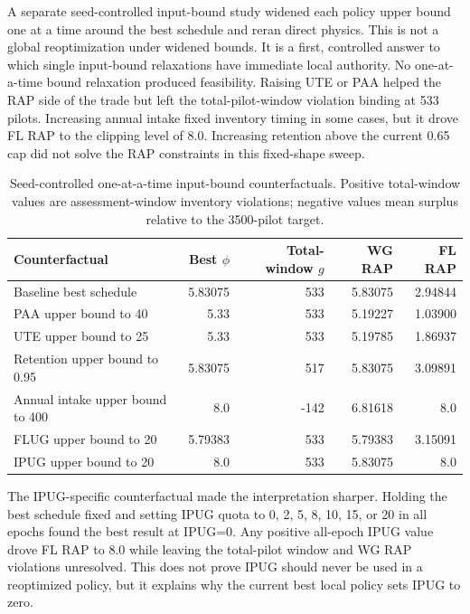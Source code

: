 \documentclass[10pt]{article}
\begin{document}
A separate seed-controlled input-bound study widened each policy upper bound
one at a time around the best schedule and reran direct physics. This is not a
global reoptimization under widened bounds. It is a first, controlled answer to
which single input-bound relaxations have immediate local authority. No
one-at-a-time bound relaxation produced feasibility. Raising UTE or PAA helped
the RAP side of the trade but left the total-pilot-window violation binding at
533 pilots. Increasing annual intake fixed inventory timing in some cases, but
it drove FL RAP to the clipping level of 8.0. Increasing retention above the
current 0.65 cap did not solve the RAP constraints in this fixed-shape sweep.

\begin{table}[htbp]
\centering
\caption{Seed-controlled one-at-a-time input-bound counterfactuals. Positive
total-window values are assessment-window inventory violations; negative values
mean surplus relative to the 3500-pilot target.}
\label{tab:bound-relaxation}
\begin{tabular}{lrrrr}
\toprule
Counterfactual & Best $\phi$ & Total-window $g$ & WG RAP & FL RAP \\
\midrule
Baseline best schedule & 5.83075 & 533 & 5.83075 & 2.94844 \\
PAA upper bound to 40 & 5.33 & 533 & 5.19227 & 1.03900 \\
UTE upper bound to 25 & 5.33 & 533 & 5.19785 & 1.86937 \\
Retention upper bound to 0.95 & 5.83075 & 517 & 5.83075 & 3.09891 \\
Annual intake upper bound to 400 & 8.0 & -142 & 6.81618 & 8.0 \\
FLUG upper bound to 20 & 5.79383 & 533 & 5.79383 & 3.15091 \\
IPUG upper bound to 20 & 8.0 & 533 & 5.83075 & 8.0 \\
\bottomrule
\end{tabular}
\end{table}

The IPUG-specific counterfactual made the interpretation sharper. Holding the
best schedule fixed and setting IPUG quota to 0, 2, 5, 8, 10, 15, or 20 in all
epochs found the best result at IPUG=0. Any positive all-epoch IPUG value drove
FL RAP to 8.0 while leaving the total-pilot window and WG RAP violations
unresolved. This does not prove IPUG should never be used in a reoptimized
policy, but it explains why the current best local policy sets IPUG to zero.
\end{document}

